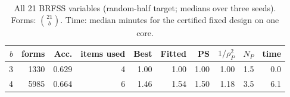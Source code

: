 \begin{table}[h]
\centering
\caption{All 21 BRFSS variables (random-half target; medians over three seeds). Forms: $\binom{21}b$. Time: median minutes for the certified fixed design on one core.}
\label{tab:scale}
\small
\begin{tabular}{rrrrrrrrrr}
\toprule
$b$ & forms & Acc. & items used & Best & Fitted & PS & $1/\rho_P^2$ & $N_P$ & time \\
\midrule
3 & 1330 & 0.629 & 4 & 1.00 & 1.00 & 1.00 & 1.00 & 1.5 & 0.0 \\
4 & 5985 & 0.664 & 6 & 1.46 & 1.54 & 1.50 & 1.18 & 3.5 & 6.1 \\
\bottomrule
\end{tabular}
\end{table}
